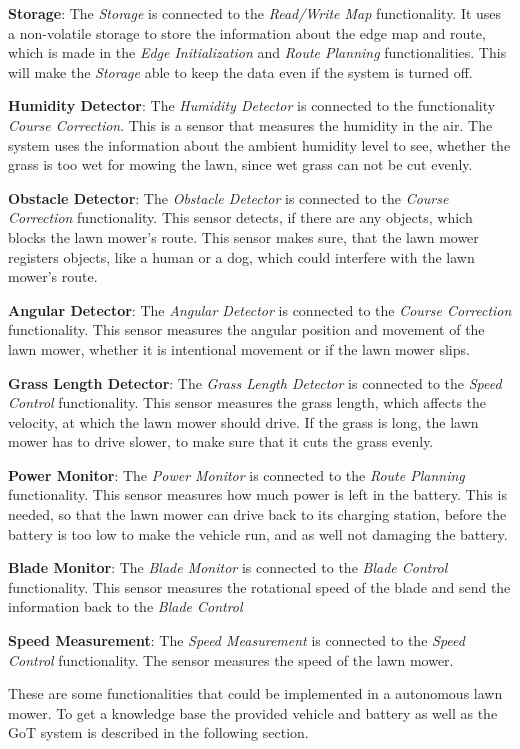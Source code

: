 \textbf{Storage}:
The \textit{Storage} is connected to the \textit{Read/Write Map} functionality. It uses a non-volatile storage to store the information about the edge map and route, which is made in the \textit{Edge Initialization} and \textit{Route Planning} functionalities. This will make the \textit{Storage} able to keep the data even if the system is turned off.

\textbf{Humidity Detector}:
The \textit{Humidity Detector} is connected to the functionality \textit{Course Correction}. This is a sensor that measures the humidity in the air. The system uses the information about the ambient humidity level to see, whether the grass is too wet for mowing the lawn, since wet grass can not be cut evenly. 

\textbf{Obstacle Detector}:
The \textit{Obstacle Detector} is connected to the \textit{Course Correction} functionality. This sensor detects, if there are any objects, which blocks the lawn mower's route. This sensor makes sure, that the lawn mower registers objects, like a human or a dog, which could interfere with the lawn mower's route.

\textbf{Angular Detector}:
The \textit{Angular Detector} is connected to the \textit{Course Correction} functionality. This sensor measures the angular position and movement of the lawn mower, whether it is intentional movement or if the lawn mower slips.

\textbf{Grass Length Detector}:
The \textit{Grass Length Detector} is connected to the \textit{Speed Control} functionality. This sensor measures the  grass length, which affects the velocity, at which the lawn mower should drive. If the grass is long, the lawn mower has to drive slower, to make sure that it cuts the grass evenly. 

\textbf{Power Monitor}:
The \textit{Power Monitor} is connected to the \textit{Route Planning} functionality. This sensor measures how much power is left in the battery. This is needed, so that the lawn mower can drive back to its charging station, before the battery is too low to make the vehicle run, and as well not damaging the battery.

\textbf{Blade Monitor}:
The \textit{Blade Monitor} is connected to the \textit{Blade Control} functionality. This sensor measures the rotational speed of the blade and send the information back to the \textit{Blade Control}

\textbf{Speed Measurement}:
The \textit{Speed Measurement} is connected to the \textit{Speed Control} functionality. The sensor measures the speed of the lawn mower.

These are some functionalities that could be implemented in a autonomous lawn mower. To get a knowledge base the provided vehicle and battery as well as the GoT system is described in the following section. 